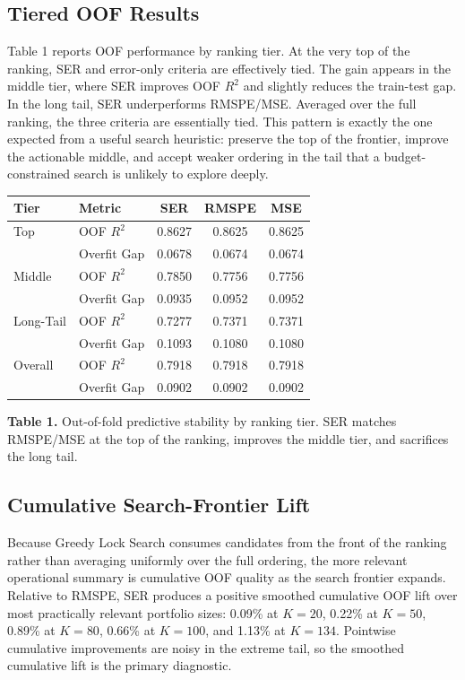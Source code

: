 \documentclass[11pt]{article}
\begin{document}
\subsection{Tiered OOF Results}
Table 1 reports OOF performance by ranking tier. At the very top of the ranking, SER and error-only criteria are effectively tied. The gain appears in the middle tier, where SER improves OOF $R^2$ and slightly reduces the train-test gap. In the long tail, SER underperforms RMSPE/MSE. Averaged over the full ranking, the three criteria are essentially tied. This pattern is exactly the one expected from a useful search heuristic: preserve the top of the frontier, improve the actionable middle, and accept weaker ordering in the tail that a budget-constrained search is unlikely to explore deeply.

\begin{center}
\small
\begin{tabular}{llccc}
\hline
Tier & Metric & SER & RMSPE & MSE \\
\hline
Top & OOF $R^2$ & 0.8627 & 0.8625 & 0.8625 \\
 & Overfit Gap & 0.0678 & 0.0674 & 0.0674 \\
Middle & OOF $R^2$ & 0.7850 & 0.7756 & 0.7756 \\
 & Overfit Gap & 0.0935 & 0.0952 & 0.0952 \\
Long-Tail & OOF $R^2$ & 0.7277 & 0.7371 & 0.7371 \\
 & Overfit Gap & 0.1093 & 0.1080 & 0.1080 \\
Overall & OOF $R^2$ & 0.7918 & 0.7918 & 0.7918 \\
 & Overfit Gap & 0.0902 & 0.0902 & 0.0902 \\
\hline
\end{tabular}
\end{center}

\noindent\textbf{Table 1.} Out-of-fold predictive stability by ranking tier. SER matches RMSPE/MSE at the top of the ranking, improves the middle tier, and sacrifices the long tail.

\subsection{Cumulative Search-Frontier Lift}
Because Greedy Lock Search consumes candidates from the front of the ranking rather than averaging uniformly over the full ordering, the more relevant operational summary is cumulative OOF quality as the search frontier expands. Relative to RMSPE, SER produces a positive smoothed cumulative OOF lift over most practically relevant portfolio sizes: 0.09\% at $K=20$, 0.22\% at $K=50$, 0.89\% at $K=80$, 0.66\% at $K=100$, and 1.13\% at $K=134$. Pointwise cumulative improvements are noisy in the extreme tail, so the smoothed cumulative lift is the primary diagnostic.
\end{document}
